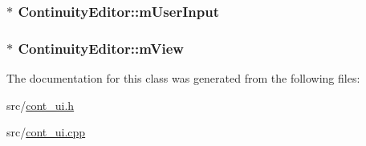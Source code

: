 \hypertarget{a00059_a31dc18431e666579860cadbffd361617}{
\subsubsection[{m\-User\-Input}]{$\ast$ Continuity\-Editor\-::m\-User\-Input\hspace{0.3cm}{\ttfamily [private]}}}\label{a00059_a31dc18431e666579860cadbffd361617}
\hypertarget{a00059_a8ad7327450c133c44597a8118ffb763d}{
\subsubsection[{m\-View}]{$\ast$ Continuity\-Editor\-::m\-View\hspace{0.3cm}{\ttfamily [private]}}}\label{a00059_a8ad7327450c133c44597a8118ffb763d}


The documentation for this class was generated from the following files\-:\begin{DoxyCompactItemize}
\item 
src/\hyperlink{a00193}{cont\-\_\-ui.\-h}\item 
src/\hyperlink{a00192}{cont\-\_\-ui.\-cpp}\end{DoxyCompactItemize}
